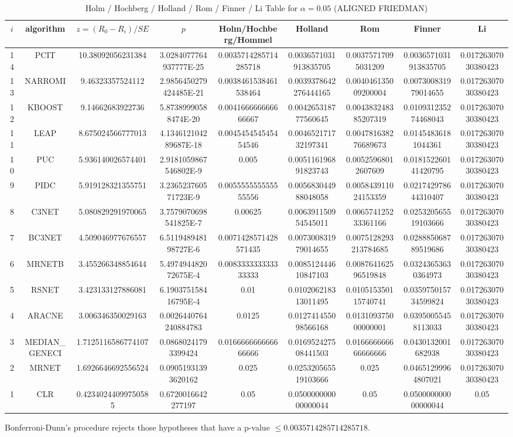 \documentclass[a4paper,10pt]{article}
\begin{document}
\begin{landscape}
\begin{table}[!htp]
\centering\scriptsize
\caption{Holm / Hochberg / Holland / Rom / Finner / Li Table for $\alpha=0.05$ (ALIGNED FRIEDMAN)}
\begin{tabular}{ccccccccc}
$i$&algorithm&$z=(R_0 - R_i)/SE$&$p$&Holm/Hochberg/Hommel&Holland&Rom&Finner&Li\\
\hline
14&PCIT&10.38092056231384&3.0284077764937777E-25&0.0035714285714285718&0.0036571031913835705&0.00375717095031209&0.0036571031913835705&0.01726307030380423\\
13&NARROMI&9.46323357524112&2.9856450279424485E-21&0.0038461538461538464&0.0039378642276444165&0.004046135009200004&0.007300831979014655&0.01726307030380423\\
12&KBOOST&9.14662683922736&5.87389990588474E-20&0.004166666666666667&0.004265318777560645&0.004383248385207319&0.010931235274468043&0.01726307030380423\\
11&LEAP&8.675024566777013&4.134612104289687E-18&0.004545454545454546&0.004652171732197341&0.004781638276689673&0.01454836181044361&0.01726307030380423\\
10&PUC&5.936140026574401&2.9181059867546802E-9&0.005&0.005116196891823743&0.00525968012607609&0.018152260141420795&0.01726307030380423\\
9&PIDC&5.919128321355751&3.236523760571723E-9&0.005555555555555556&0.005683044988048058&0.005843911024153359&0.021742978644310407&0.01726307030380423\\
8&C3NET&5.080829291970065&3.7579070698541825E-7&0.00625&0.006391150954545011&0.006574125233361166&0.025320565519103666&0.01726307030380423\\
7&BC3NET&4.509046977676557&6.511948948198727E-6&0.0071428571428571435&0.007300831979014655&0.0075128293213784685&0.028885068789519686&0.01726307030380423\\
6&MRNETB&3.455266348854644&5.497494482072675E-4&0.008333333333333333&0.008512444610847103&0.008764162596519848&0.03243653630364973&0.01726307030380423\\
5&RSNET&3.423133127886081&6.190375158416795E-4&0.01&0.010206218313011495&0.010515350115740741&0.035975015734599824&0.01726307030380423\\
4&ARACNE&3.006346350029163&0.0026440764240884783&0.0125&0.012741455098566168&0.013109375000000001&0.03950055458113033&0.01726307030380423\\
3&MEDIAN_GENECI&1.7125116586774107&0.08680241793399424&0.016666666666666666&0.016952427508441503&0.016666666666666666&0.0430132001682938&0.01726307030380423\\
2&MRNET&1.6926646692556524&0.09051931393620162&0.025&0.025320565519103666&0.025&0.04651299964807021&0.01726307030380423\\
1&CLR&0.42340244099750585&0.6720016642277197&0.05&0.050000000000000044&0.05&0.050000000000000044&0.05\\
\hline
\end{tabular}
\end{table}
Bonferroni-Dunn's procedure rejects those hypotheses that have a p-value $\le0.0035714285714285718$.



\end{landscape}
\end{document}
